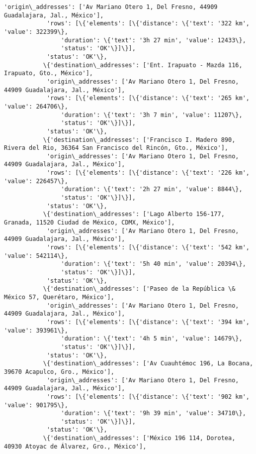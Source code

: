 \documentclass[11pt]{article}
\begin{document}
\begin{Verbatim}[commandchars=\\\{\}]
            'origin\_addresses': ['Av Mariano Otero 1, Del Fresno, 44909 Guadalajara, Jal., México'],
            'rows': [\{'elements': [\{'distance': \{'text': '322 km', 'value': 322399\},
                'duration': \{'text': '3h 27 min', 'value': 12433\},
                'status': 'OK'\}]\}],
            'status': 'OK'\},
           \{'destination\_addresses': ['Ent. Irapuato - Mazda 116, Irapuato, Gto., México'],
            'origin\_addresses': ['Av Mariano Otero 1, Del Fresno, 44909 Guadalajara, Jal., México'],
            'rows': [\{'elements': [\{'distance': \{'text': '265 km', 'value': 264706\},
                'duration': \{'text': '3h 7 min', 'value': 11207\},
                'status': 'OK'\}]\}],
            'status': 'OK'\},
           \{'destination\_addresses': ['Francisco I. Madero 890, Rivera del Rio, 36364 San Francisco del Rincón, Gto., México'],
            'origin\_addresses': ['Av Mariano Otero 1, Del Fresno, 44909 Guadalajara, Jal., México'],
            'rows': [\{'elements': [\{'distance': \{'text': '226 km', 'value': 226457\},
                'duration': \{'text': '2h 27 min', 'value': 8844\},
                'status': 'OK'\}]\}],
            'status': 'OK'\},
           \{'destination\_addresses': ['Lago Alberto 156-177, Granada, 11520 Ciudad de México, CDMX, México'],
            'origin\_addresses': ['Av Mariano Otero 1, Del Fresno, 44909 Guadalajara, Jal., México'],
            'rows': [\{'elements': [\{'distance': \{'text': '542 km', 'value': 542114\},
                'duration': \{'text': '5h 40 min', 'value': 20394\},
                'status': 'OK'\}]\}],
            'status': 'OK'\},
           \{'destination\_addresses': ['Paseo de la República \& México 57, Querétaro, México'],
            'origin\_addresses': ['Av Mariano Otero 1, Del Fresno, 44909 Guadalajara, Jal., México'],
            'rows': [\{'elements': [\{'distance': \{'text': '394 km', 'value': 393961\},
                'duration': \{'text': '4h 5 min', 'value': 14679\},
                'status': 'OK'\}]\}],
            'status': 'OK'\},
           \{'destination\_addresses': ['Av Cuauhtémoc 196, La Bocana, 39670 Acapulco, Gro., México'],
            'origin\_addresses': ['Av Mariano Otero 1, Del Fresno, 44909 Guadalajara, Jal., México'],
            'rows': [\{'elements': [\{'distance': \{'text': '902 km', 'value': 901795\},
                'duration': \{'text': '9h 39 min', 'value': 34710\},
                'status': 'OK'\}]\}],
            'status': 'OK'\},
           \{'destination\_addresses': ['México 196 114, Dorotea, 40930 Atoyac de Álvarez, Gro., México'],

\end{Verbatim}
\end{document}
